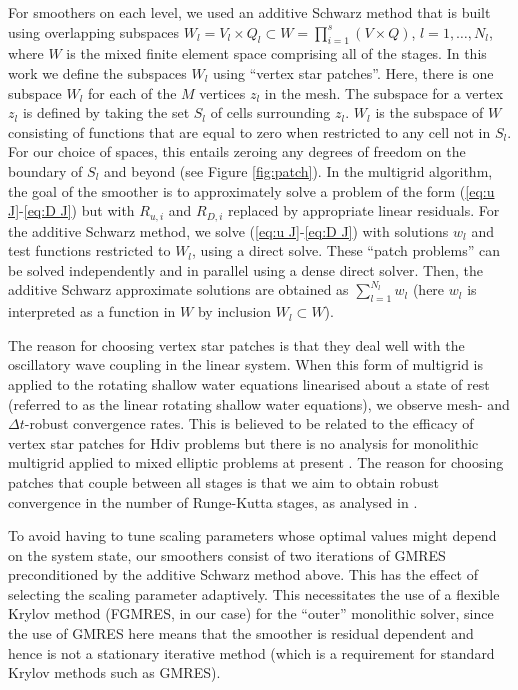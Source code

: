 \documentclass[a4paper, 12pt]{article}
\begin{document}
For smoothers on each level, we used an additive Schwarz method that
is built using overlapping subspaces $W_l=V_l\times Q_l \subset W =
\prod_{i=1}^s\left(V \times Q\right)$, $l=1,\ldots,N_l$, where $W$ is
the mixed finite element space comprising all of the stages.
In this work we define the subspaces $W_l$ using ``vertex
star patches''.
Here, there is one subspace $W_l$ for each of the $M$
vertices $z_l$ in the mesh.
The subspace for a vertex $z_l$ is defined by
taking the set $S_l$ of cells surrounding $z_l$. $W_l$ is the subspace
of $W$ consisting of functions that are equal to zero when restricted
to any cell not in $S_l$. For our choice of spaces, this entails
zeroing any degrees of freedom on the boundary of $S_l$ and beyond
(see Figure \ref{fig:patch}). In the multigrid algorithm, the goal of
the smoother is to approximately solve a problem of the form
(\ref{eq:u J}-\ref{eq:D J}) but with $R_{u,i}$ and $R_{D,i}$ replaced
by appropriate linear residuals.
For the additive
Schwarz method, we solve (\ref{eq:u J}-\ref{eq:D J}) with solutions
$w_l$ and test functions restricted to $W_l$, using a direct
solve. These ``patch problems'' can be solved independently and in
parallel using a dense direct solver.  Then, the additive Schwarz
approximate solutions are obtained as $\sum_{l=1}^{N_l}w_l$ (here
$w_l$ is interpreted as a function in $W$ by inclusion $W_l\subset
W$).


The reason for choosing vertex star patches is that they deal well
with the oscillatory wave coupling in the linear system. When this
form of multigrid is applied to the rotating shallow water equations
linearised about a state of rest (referred to as the linear rotating
shallow water equations), we observe mesh- and $\Delta t$-robust
convergence rates.
This is believed to be related to the efficacy of
vertex star patches for Hdiv problems \citep{arnold2000multigrid} but
there is no analysis for monolithic multigrid applied to mixed
elliptic problems at present \citep{sm}. The reason for choosing patches
that couple between all stages is that we aim to obtain robust
convergence in the number of Runge-Kutta stages, as analysed in
\citep{kirby2024convergence}.

To avoid having to tune scaling parameters whose optimal values might
depend on the system state, our smoothers consist of two iterations of
GMRES preconditioned by the additive Schwarz method above. This has
the effect of selecting the scaling parameter adaptively.  This
necessitates the use of a flexible Krylov method (FGMRES, in our case)
for the ``outer'' monolithic solver, since the use of GMRES here means
that the smoother is residual dependent and hence is not a stationary
iterative method (which is a requirement for standard Krylov methods
such as GMRES).
\end{document}
